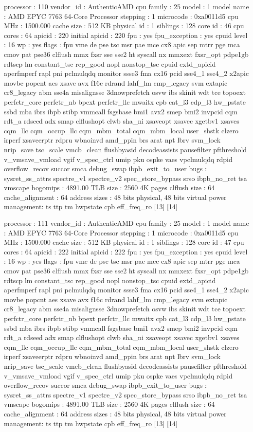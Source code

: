 processor	: 110
vendor_id	: AuthenticAMD
cpu family	: 25
model		: 1
model name	: AMD EPYC 7763 64-Core Processor
stepping	: 1
microcode	: 0xa0011d5
cpu MHz		: 1500.000
cache size	: 512 KB
physical id	: 1
siblings	: 128
core id		: 46
cpu cores	: 64
apicid		: 220
initial apicid	: 220
fpu		: yes
fpu_exception	: yes
cpuid level	: 16
wp		: yes
flags		: fpu vme de pse tsc msr pae mce cx8 apic sep mtrr pge mca cmov pat pse36 clflush mmx fxsr sse sse2 ht syscall nx mmxext fxsr_opt pdpe1gb rdtscp lm constant_tsc rep_good nopl nonstop_tsc cpuid extd_apicid aperfmperf rapl pni pclmulqdq monitor ssse3 fma cx16 pcid sse4_1 sse4_2 x2apic movbe popcnt aes xsave avx f16c rdrand lahf_lm cmp_legacy svm extapic cr8_legacy abm sse4a misalignsse 3dnowprefetch osvw ibs skinit wdt tce topoext perfctr_core perfctr_nb bpext perfctr_llc mwaitx cpb cat_l3 cdp_l3 hw_pstate ssbd mba ibrs ibpb stibp vmmcall fsgsbase bmi1 avx2 smep bmi2 invpcid cqm rdt_a rdseed adx smap clflushopt clwb sha_ni xsaveopt xsavec xgetbv1 xsaves cqm_llc cqm_occup_llc cqm_mbm_total cqm_mbm_local user_shstk clzero irperf xsaveerptr rdpru wbnoinvd amd_ppin brs arat npt lbrv svm_lock nrip_save tsc_scale vmcb_clean flushbyasid decodeassists pausefilter pfthreshold v_vmsave_vmload vgif v_spec_ctrl umip pku ospke vaes vpclmulqdq rdpid overflow_recov succor smca debug_swap ibpb_exit_to_user
bugs		: sysret_ss_attrs spectre_v1 spectre_v2 spec_store_bypass srso ibpb_no_ret tsa vmscape
bogomips	: 4891.00
TLB size	: 2560 4K pages
clflush size	: 64
cache_alignment	: 64
address sizes	: 48 bits physical, 48 bits virtual
power management: ts ttp tm hwpstate cpb eff_freq_ro [13] [14]

processor	: 111
vendor_id	: AuthenticAMD
cpu family	: 25
model		: 1
model name	: AMD EPYC 7763 64-Core Processor
stepping	: 1
microcode	: 0xa0011d5
cpu MHz		: 1500.000
cache size	: 512 KB
physical id	: 1
siblings	: 128
core id		: 47
cpu cores	: 64
apicid		: 222
initial apicid	: 222
fpu		: yes
fpu_exception	: yes
cpuid level	: 16
wp		: yes
flags		: fpu vme de pse tsc msr pae mce cx8 apic sep mtrr pge mca cmov pat pse36 clflush mmx fxsr sse sse2 ht syscall nx mmxext fxsr_opt pdpe1gb rdtscp lm constant_tsc rep_good nopl nonstop_tsc cpuid extd_apicid aperfmperf rapl pni pclmulqdq monitor ssse3 fma cx16 pcid sse4_1 sse4_2 x2apic movbe popcnt aes xsave avx f16c rdrand lahf_lm cmp_legacy svm extapic cr8_legacy abm sse4a misalignsse 3dnowprefetch osvw ibs skinit wdt tce topoext perfctr_core perfctr_nb bpext perfctr_llc mwaitx cpb cat_l3 cdp_l3 hw_pstate ssbd mba ibrs ibpb stibp vmmcall fsgsbase bmi1 avx2 smep bmi2 invpcid cqm rdt_a rdseed adx smap clflushopt clwb sha_ni xsaveopt xsavec xgetbv1 xsaves cqm_llc cqm_occup_llc cqm_mbm_total cqm_mbm_local user_shstk clzero irperf xsaveerptr rdpru wbnoinvd amd_ppin brs arat npt lbrv svm_lock nrip_save tsc_scale vmcb_clean flushbyasid decodeassists pausefilter pfthreshold v_vmsave_vmload vgif v_spec_ctrl umip pku ospke vaes vpclmulqdq rdpid overflow_recov succor smca debug_swap ibpb_exit_to_user
bugs		: sysret_ss_attrs spectre_v1 spectre_v2 spec_store_bypass srso ibpb_no_ret tsa vmscape
bogomips	: 4891.00
TLB size	: 2560 4K pages
clflush size	: 64
cache_alignment	: 64
address sizes	: 48 bits physical, 48 bits virtual
power management: ts ttp tm hwpstate cpb eff_freq_ro [13] [14]

